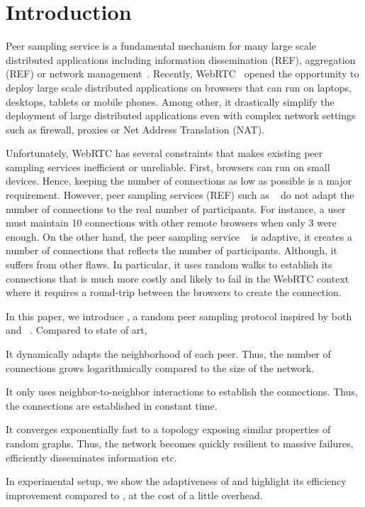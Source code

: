 
\section{Introduction}

Peer sampling service is a fundamental mechanism for many large scale
distributed applications including information dissemination (REF), aggregation
(REF) or network management~\cite{jelasity2007gossip}. Recently,
WebRTC~\cite{webrtc} opened the opportunity to deploy large scale distributed
applications on browsers that can run on laptops, desktops, tablets or mobile
phones. Among other, it drastically simplify the deployment of large
distributed applications even with complex network settings such as firewall,
proxies or Net Address Translation (NAT).

Unfortunately, WebRTC has several constraints that makes existing peer sampling
services inefficient or unreliable. First, browsers can run on small
devices. Hence, keeping the number of connections as low as possible is a major
requirement. However, peer sampling services (REF) such as \CYCLON{}~\cite{
  voulgaris2005cyclon} do not adapt the number of connections to the real
number of participants. For instance, a user must maintain 10 connections with
other remote browsers when only 3 were enough. On the other hand, the peer
sampling service \SCAMP{}~\cite{ganesh2003peer} is adaptive, it creates a
number of connections that reflects the number of participants. Although, it
suffers from other flaws. In particular, it uses random walks to establish its
connections that is much more costly and likely to fail in the WebRTC context
where it requires a round-trip between the browsers to create the connection.

In this paper, we introduce \SCAMPLON{}, a random peer sampling protocol
inspired by both \SCAMP{}~\cite{ganesh2003peer} and
\CYCLON{}~\cite{voulgaris2005cyclon}. Compared to state of art,
\begin{inparaenum}[(i)]
\item It dynamically adapts the neighborhood of each peer. Thus, the number of
  connections grows logarithmically compared to the size of the network.
\item It only uses neighbor-to-neighbor interactions to establish the
  connections. Thus, the connections are established in constant time.
\item It converges exponentially fast to a topology exposing similar properties
  of random graphs. Thus, the network becomes quickly resilient to massive
  failures, efficiently disseminates information etc.
\item In experimental setup, we show the adaptiveness of \SCAMPLON{} and
  highlight its efficiency improvement compared to \CYCLON{}, at the cost of a
  little overhead.
\end{inparaenum}

